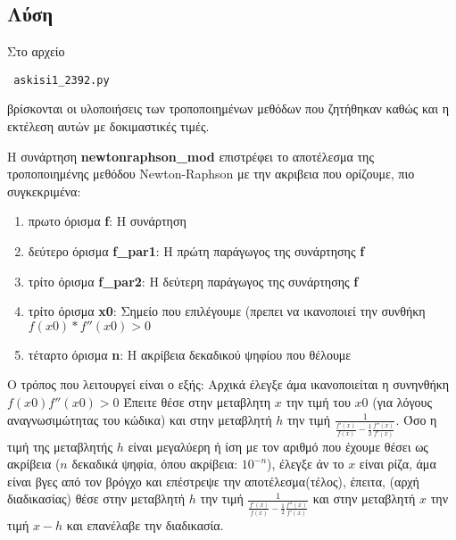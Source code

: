 \documentclass[a4paper,11pt]{article}
\newcommand{\lt}{\latintext}
\newcommand{\gt}{\greektext}
\begin{document}
\subsection{Λύση}
\begin{flushleft}
Στο αρχείο \lt 
\begin{verbatim} askisi1_2392.py
 \end{verbatim} 
 \gt βρίσκονται οι υλοποιήσεις των τροποποιημένων μεθόδων που ζητήθηκαν καθώς και η εκτέλεση αυτών με δοκιμαστικές τιμές.\linebreak \\

\item Η συνάρτηση \lt \textbf{newtonraphson\_mod} \gt επιστρέφει το αποτέλεσμα της τροποποιημένης μεθόδου \lt Newton-Raphson \gt με την ακριβεια που ορίζουμε, πιο συγκεκριμένα:\linebreak 
	\begin{enumerate}
\item πρωτο όρισμα \lt \textbf{f}: \gt Η συνάρτηση
\item δεύτερο όρισμα \lt \textbf{f\_par1}: \gt Η πρώτη παράγωγος της συνάρτησης \lt \textbf{f} 
\item\gt τρίτο όρισμα \lt \textbf{f\_par2}: \gt Η δεύτερη παράγωγος της συνάρτησης \lt \textbf{f}
\item \gt τρίτο όρισμα \lt \textbf{x0}: \gt Σημείο που επιλέγουμε (πρεπει να ικανοποιεί την συνθήκη \lt $f(x0)*f''(x0)>0$
\item \gt τέταρτο όρισμα \lt \textbf{n}: \gt Η ακρίβεια δεκαδικού ψηφίου που θέλουμε
\end{enumerate}
Ο τρόπος που λειτουργεί είναι ο εξής:\linebreak 
	Αρχικά έλεγξε άμα ικανοποιείται η συνηνθήκη $f(x0)f''(x0)>0$\linebreak
	Έπειτε θέσε στην μεταβλητη $x$ την τιμή του $x0$ (για λόγους αναγνωσιμώτητας του κώδικα) και στην μεταβλητή $h$ την τιμή $\frac{1}{\frac{f'(x)}{f(x)}-\frac{1}{2}\frac{f''(x)}{f'(x)}}$.
	Όσο η τιμή της μεταβλητής $h$ είναι μεγαλύερη ή ίση με τον αριθμό που έχουμε θέσει ως ακρίβεια ($n$ δεκαδικά ψηφία, όπου ακρίβεια: $10^{-n}$), έλεγξε άν το $x$ είναι ρίζα, άμα είναι βγες από τον βρόγχο και επέστρεψε την αποτέλεσμα(τέλος),\linebreak
	έπειτα, (αρχή διαδικασίας) θέσε στην μεταβλητή $h$ την τιμή $\frac{1}{\frac{f'(x)}{f(x)}-\frac{1}{2}\frac{f''(x)}{f'(x)}}$ και στην μεταβλητή $x$ την τιμή $x-h$ και επανέλαβε την διαδικασία.  
	\linebreak



\end{flushleft}
\end{document}
